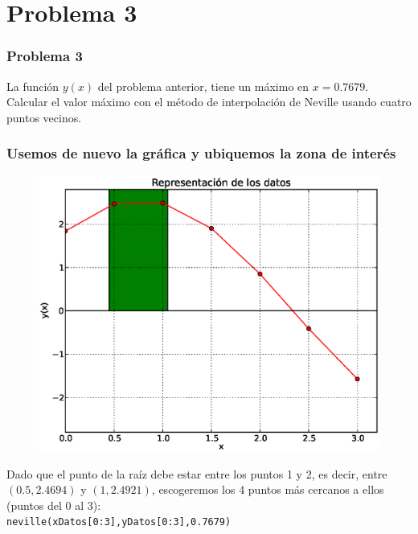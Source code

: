\section{Problema 3}
\begin{frame}
\frametitle{Problema 3}
La funci\'{o}n $y(x)$ del problema anterior, tiene un m\'{a}ximo en $x=0.7679$. Calcular el valor m\'{a}ximo con el m\'{e}todo de interpolaci\'{o}n de Neville usando cuatro puntos vecinos.
\\
\bigskip
{}
\end{frame}
\begin{frame}
\frametitle{Usemos de nuevo la gr\'{a}fica y ubiquemos la zona de inter\'{e}s}
\begin{figure}
	\centering
	\includegraphics[scale=0.45]{Imagenes/Tarea_Raices_Problema_3_01.eps} 
\end{figure}
\end{frame}
\begin{frame}
Dado que el punto de la ra\'{i}z debe estar entre los puntos 1 y 2, es decir, entre $(0.5,2.4694)$ y $(1,2.4921)$, escogeremos los 4 puntos m\'{a}s cercanos a ellos (puntos del 0 al 3):
\\
\medskip
\texttt{neville(xDatos[0:3],yDatos[0:3],0.7679)}
\\
\bigskip
{}
\end{frame}
